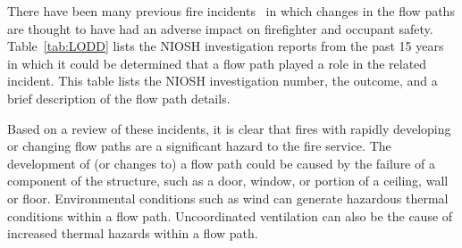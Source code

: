 \documentclass[12pt,oneside]{book}
\begin{document}
There have been many previous fire incidents~\cite{NIOSH:Pettit,NIOSH:Washenitz,NIOSH:Mezzanotte,NIOSH:McFall,NIOSH:McFall2,NIOSH:McFall3,NIOSH:Berardinelli,NIOSH:Koedam,NIOSH:McFall4,NIOSH:Tarley,NIOSH:Braddee,NIOSH:Merinar,NIOSH:Bowyer2,NIOSH:Loflin,NIOSH:Bowyer} in which changes in the flow paths are thought to have had an adverse impact on firefighter and occupant safety. Table~\ref{tab:LODD} lists the NIOSH investigation reports from the past 15 years in which it could be determined that a flow path played a role in the related incident. This table lists the NIOSH investigation number, the outcome, and a brief description of the flow path details.

Based on a review of these incidents, it is clear that fires with rapidly developing or changing flow paths are a significant hazard to the fire service. The development of (or changes to) a flow path could be caused by the failure of a component of the structure, such as a door, window, or portion of a ceiling, wall or floor. Environmental conditions such as wind can generate hazardous thermal conditions within a flow path. Uncoordinated ventilation can also be the cause of increased thermal hazards within a flow path. 
\end{document}
